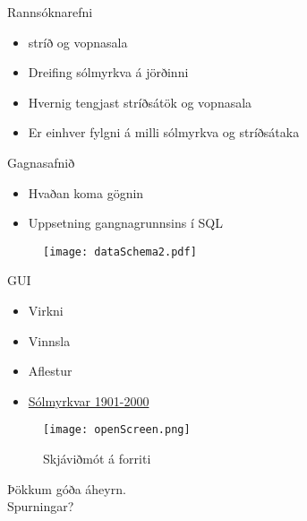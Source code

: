 \documentclass{rubeamer}
\begin{document}
\rutitleframe{}


\begin{frame}{Rannsóknarefni}
	\begin{itemize}
		\item stríð og vopnasala 
		\item Dreifing sólmyrkva á jörðinni
		\item Hvernig tengjast stríðsátök og vopnasala
		\item Er einhver fylgni á milli sólmyrkva og stríðsátaka
		
	\end{itemize}
\end{frame}

\begin{frame}{Gagnasafnið}
	\vspace{1em}
	\begin{itemize}
		\item Hvaðan koma gögnin\cite{conflict} \cite{Eclipse} \cite{weapon}
		\item Uppsetning gangnagrunnsins í SQL
	\end{itemize}
	
	\begin{figure}
		\centering
		\texttt{[image: dataSchema2.pdf]}
	\end{figure}
\end{frame}

\begin{frame}{GUI}
	\begin{itemize}
		\item Virkni \cite{qt4} \cite{basemap}
		\item Vinnsla \cite{Qdarkstyle}
		\item Aflestur
		\item \href{file:///C:/haukur/skoli/5.onn/gagnavinnsla/Gagnavinnsla.git/trunk/lokaverkefni/kynning/graphics/SpinningGlobe.gif}{Sólmyrkvar 1901-2000} \cite{moviepy}
	\end{itemize}
	\begin{figure}
		\centering
		\texttt{[image: openScreen.png]}
		\caption*{Skjáviðmót á forriti}
	\end{figure}
\end{frame}

	
\begin{frame}
	\centering
	Þökkum góða áheyrn. \\
	Spurningar?\\
\end{frame}

\bibframe
\end{document}
